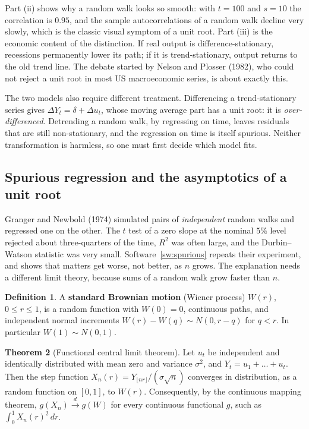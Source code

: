 \documentclass[11pt,a4paper]{article}
\numberwithin{equation}{section}
\theoremstyle{definition}
\newtheorem{thm}{Theorem}[subsection]
\newtheorem{defn}[thm]{Definition}
\begin{document}
Part (ii) shows why a random walk looks so smooth: with $t = 100$ and $s = 10$ the correlation is $0.95$, and the sample autocorrelations of a random walk
decline very slowly, which is the classic visual symptom of a unit root. Part (iii) is the economic content of the distinction. If real output is
difference-stationary, recessions permanently lower its path; if it is trend-stationary, output returns to the old trend line. The debate
started by Nelson and Plosser (1982), who could not reject a unit root in most US macroeconomic series, is about exactly this.

The two models also require different treatment. Differencing a trend-stationary series gives $\Delta Y_t = \delta + \Delta u_t$, whose moving average part has a unit
root: it is \emph{over-differenced}. Detrending a random walk, by regressing on time, leaves residuals that are still non-stationary, and the regression
on time is itself spurious. Neither transformation is harmless, so one must first decide which model fits.

\subsection{Spurious regression and the asymptotics of a unit root}
\label{ssec:spurious}

Granger and Newbold (1974) simulated pairs of \emph{independent} random walks and regressed one on the other. The $t$ test of a zero slope at the nominal
$5\%$ level rejected about three-quarters of the time, $R^2$ was often large, and the Durbin--Watson statistic was very small.
Software~\ref{sw:spurious} repeats their experiment, and shows that matters get worse, not better, as $n$ grows. The explanation needs a different
limit theory, because sums of a random walk grow faster than $n$.

\begin{defn}
A \textbf{standard Brownian motion} (Wiener process) $W(r)$, $0 \leq r \leq 1$, is a random function with $W(0) = 0$, continuous paths, and independent
normal increments $W(r) - W(q) \sim N(0, r - q)$ for $q < r$. In particular $W(1) \sim N(0, 1)$.
\end{defn}

\begin{thm}[Functional central limit theorem]
\label{thm:fclt}
Let $u_t$ be independent and identically distributed with mean zero and variance $\sigma^2$, and $Y_t = u_1 + \dots + u_t$. Then the step function
$X_n(r) = Y_{\lfloor nr\rfloor}/(\sigma\sqrt n)$ converges in distribution, as a random function on $[0, 1]$, to $W(r)$. Consequently, by the continuous mapping theorem,
$g(X_n) \xrightarrow{d} g(W)$ for every continuous functional $g$, such as $\int_0^1X_n(r)^2\,dr$.
\end{thm}
\end{document}
